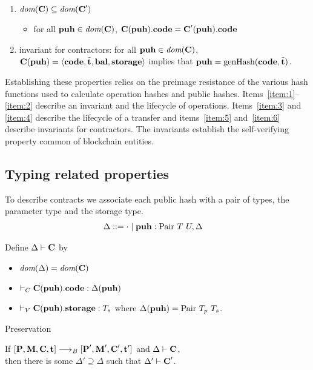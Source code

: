 \documentclass[a4paper]{llncs}
\begin{document}
\begin{proposition}
\begin{enumerate}
 \item\label{item:5} $ \textit{dom} (\textbf{C}) \subseteq \textit{dom} (\textbf{C}')$
   \begin{itemize}
   \item for all $\textbf{puh} \in \textit{dom} (\textbf{C})$,
     $\textbf{C} (\textbf{puh}).\textbf{code} = \textbf{C}' (\textbf{puh}).\textbf{code}$
   \end{itemize}
 \item\label{item:6} invariant for contractors:
   for all $\textbf{puh} \in \textit{dom} (\textbf{C})$,
   $\textbf{C} (\textbf{puh}) = \langle \textbf{code}, \tilde{\textbf{t}}, \textbf{bal}, \textbf{storage}\rangle$
   implies that $\textbf{puh} = \textup{genHash} (\textbf{code}, \tilde{\textbf{t}})$.
\end{enumerate}
\end{proposition}
Establishing these properties relies on the preimage resistance of the
various hash functions used to calculate operation hashes and public
hashes. Items~\ref{item:1}--\ref{item:2} describe an invariant and the lifecycle of
operations. Items~\ref{item:3} and \ref{item:4} describe the lifecycle
of a transfer and items~\ref{item:5} and~\ref{item:6} describe
invariants for contractors. The invariants establish the
self-verifying property common of blockchain entities.

\subsection{Typing related properties}

To describe contracts we associate each public hash with a pair of
types, the parameter type and the storage type.
\begin{align*}
  \Delta & ::= \cdot \mid \textbf{puh}: \text{Pair}\ T\ U, \Delta
\end{align*}

Define $ \Delta \vdash \textbf{C}$ by
\begin{itemize}
\item $\textit{dom} (\Delta) = \textit{dom} (\textbf{C})$
\item $\vdash_C\textbf{C} (\textbf{puh}).\textbf{code} : \Delta (\textbf{puh})$
\item $\vdash_V\textbf{C} (\textbf{puh}).\textbf{storage}: T_s$ where
  $\Delta (\PUH) = \TPAIR\ \TYPE_p\ \TYPE_s$. 
\end{itemize}

Preservation

If $[\textbf{P}, \textbf{M}, \textbf{C}, \textbf{t}] \stackrel{{}}\longrightarrow_B{}
[\textbf{P}', \textbf{M}', \textbf{C}', \textbf{t}']$
and $\Delta \vdash \textbf{C}$, \\
then
there is some $\Delta' \supseteq \Delta$ such that $\Delta' \vdash
\textbf{C}'$. 
\end{document}

